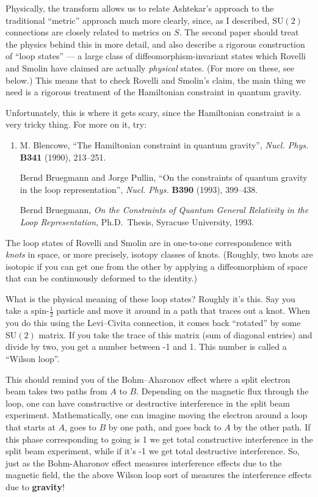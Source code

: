 \documentclass{article}
\begin{document}
Physically, the transform allows us to relate Ashtekar's approach to the
traditional ``metric'' approach much more clearly, since, as I
described, \(\mathrm{SU}(2)\) connections are closely related to metrics
on \(S\). The second paper should treat the physics behind this in more
detail, and also describe a rigorous construction of ``loop states'' ---
a large class of diffeomorphism-invariant states which Rovelli and
Smolin have claimed are actually \emph{physical} states. (For more on
these, see below.) This means that to check Rovelli and Smolin's claim,
the main thing we need is a rigorous treatment of the Hamiltonian
constraint in quantum gravity.

Unfortunately, this is where it gets scary, since the Hamiltonian
constraint is a very tricky thing. For more on it, try:

\begin{enumerate}
\def\labelenumi{\arabic{enumi})}
\setcounter{enumi}{2}
\item
  M. Blencowe, ``The Hamiltonian constraint in quantum gravity'', 
  \emph{Nucl. Phys.} \textbf{B341} (1990), 213--251.

  Bernd Bruegmann and Jorge Pullin, ``On the constraints of quantum gravity 
  in the loop representation'', \emph{Nucl. Phys.} \textbf{B390}
  (1993), 399--438.

  Bernd Bruegmann, \emph{On the Constraints of Quantum General Relativity in 
  the Loop Representation},  Ph.D.~Thesis, Syracuse University, 1993.
\end{enumerate}

The loop states of Rovelli and Smolin are in one-to-one correspondence
with \emph{knots} in space, or more precisely, isotopy classes of knots.
(Roughly, two knots are isotopic if you can get one from the other by
applying a diffeomorphism of space that can be continuously deformed to
the identity.)

What is the physical meaning of these loop states? Roughly it's this.
Say you take a spin-\(\frac12\) particle and move it around in a path
that traces out a knot. When you do this using the Levi--Civita
connection, it comes back ``rotated'' by some \(\mathrm{SU}(2)\) matrix.
If you take the trace of this matrix (sum of diagonal entries) and
divide by two, you get a number between -1 and 1. This number is called
a ``Wilson loop''.

This should remind you of the Bohm--Aharonov effect where a split
electron beam takes two paths from \(A\) to \(B\). Depending on the
magnetic flux through the loop, one can have constructive or destructive
interference in the split beam experiment. Mathematically, one can
imagine moving the electron around a loop that starts at \(A\), goes to
\(B\) by one path, and goes back to \(A\) by the other path. If this
phase corresponding to going is 1 we get total constructive interference
in the split beam experiment, while if it's -1 we get total destructive
interference. So, just as the Bohm-Aharonov effect measures interference
effects due to the magnetic field, the the above Wilson loop sort of
measures the interference effects due to \textbf{gravity}!
\end{document}
